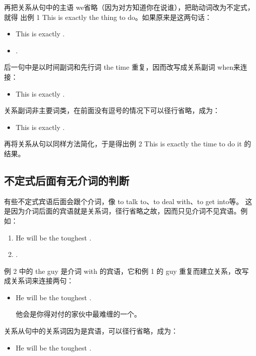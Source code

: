 再把关系从句中的主语 we省略（因为对方知道你在说谁），把助动词改为不定式，就得
出例 1 This is exactly the thing to do。如果原来是这两句话：
\begin{itemize}
\item This is exactly .
\item {}   .
\end{itemize}

后一句中是以时间副词和先行词 the time 重复，因而改写成关系副词 when来连接：
\begin{itemize}
\item This is exactly  .
\end{itemize}

关系副词非主要词类，在前面没有逗号的情况下可以径行省略，成为：
\begin{itemize}
\item This is exactly  .
\end{itemize}
再将关系从句以同样方法简化，于是得出例 2 This is exactly the time to do it 的
结果。

\subsection{不定式后面有无介词的判断}

有些不定式宾语后面会跟个介词，像 to talk to、to deal with、to get into等。
这是因为介词后面的宾语就是关系词，径行省略之故，因而只见介词不见宾语。例
如：
\begin{enumerate}
\item He will be the toughest .
\item {}   .
\end{enumerate}
例 2 中的 the guy 是介词 with 的宾语，它和例 1 的 guy
重复而建立关系，改写成关系词来连接两句：
\begin{itemize}
\item He will be the toughest  .

  他会是你得对付的家伙中最难缠的一个。
\end{itemize}

关系从句中的关系词因为是宾语，可以径行省略，成为：
\begin{itemize}
\item He will be the toughest  .
\end{itemize}

